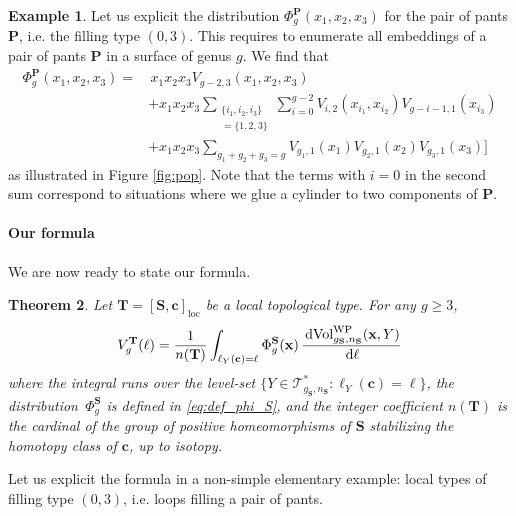 \documentclass[12pt,twoside]{article}
\theoremstyle{theorem}
\newtheorem{thm}{Theorem}[section]
\theoremstyle{remark}
\theoremstyle{definition}
\theoremstyle{example}
\newtheorem{expl}[thm]{Example}
\renewcommand{\d}{\, \mathrm{d}}
\newcommand{\x}{\mathbf{x}}
\newcommand{\1}[1]{\mathds{1}_{#1}}
\newcommand{\cT}{\mathcal{T}}
\newcommand{\Sf}{\mathbf{S}}
\newcommand{\g}{g_{\mathbf{S}}}
\newcommand{\n}{n_{\mathbf{S}}}
\newcommand{\eqc}[1]{[ #1 ]_{\mathrm{loc}}}
\newcommand{\Volwp}[1][g]{\mathrm{Vol}_{#1}^{\mathrm{\scriptsize{WP}}}}
\newcommand{\curve}{\mathbf{c}}
\newcommand{\type}{\mathbf{T}}
\begin{document}
\begin{expl}
  Let us explicit the distribution $\Phi_g^{\mathbf{P}}(x_1,x_2,x_3)$ for the pair of pants
  $\mathbf{P}$, i.e. the filling type $(0,3)$. This requires to enumerate all embeddings of a pair
  of pants $\mathbf{P}$ in a surface of genus $g$. We find that
  \begin{equation}
    \begin{split}
      \Phi_g^{\mathbf{P}}(x_1,x_2,x_3)
      = & \, x_1 x_2 x_3
       V_{g-2,3}(x_1,x_2,x_3) \\
        &+ x_1 x_2 x_3 \sum_{\substack{\{i_1, i_2, i_3\} \\ = \{1,2,3\}}}
      \sum_{i=0}^{g-2}   V_{i,2}(x_{i_1}, x_{i_2}) V_{g-i-1,1}(x_{i_3}) \\
        &+ x_1 x_2 x_3 \sum_{g_1+g_2+g_3=g} V_{g_1,1}(x_1) V_{g_2,1}(x_2) V_{g_3,1}(x_3)
          \Big]
    \end{split}
  \end{equation}
   as illustrated in Figure \ref{fig:pop}. Note that the
   terms with $i=0$ in the second sum  correspond to situations where we glue a cylinder to two
   components of $\mathbf{P}$.
   \label{exa:int_pop}
\end{expl}

\paragraph{Our formula}

We are now ready to state our formula.

\begin{thm}
  \label{thm:express_average}
  Let $\type = \eqc{\Sf,\curve}$ be a local topological type. For any $g \geq 3$, 
  \begin{equation}
    \label{eq:orbit_decomposition}
    V_g^\type(\ell)
    = \frac{1}{n(\type)}
    \int_{\ell_Y(\curve)=\ell} \Phi_g^\Sf(\x) \, \frac{\d \Volwp[\g,\n](\x,Y)}{\d \ell}
  \end{equation}
  where the integral runs over the level-set $\{ Y \in \cT_{\g,\n}^*: \ell_Y(\curve)=\ell\}$, the
  distribution~$\Phi_{g}^\Sf$ is defined in \eqref{eq:def_phi_S}, and the integer coefficient
  $n(\type)$ is the cardinal of the group of positive homeomorphisms of $\Sf$ stabilizing the
  homotopy class of $\curve$, up to isotopy.
\end{thm}

Let us explicit the formula in a non-simple elementary example: local types of filling type $(0,3)$,
i.e. loops filling a pair of pants.
\end{document}
